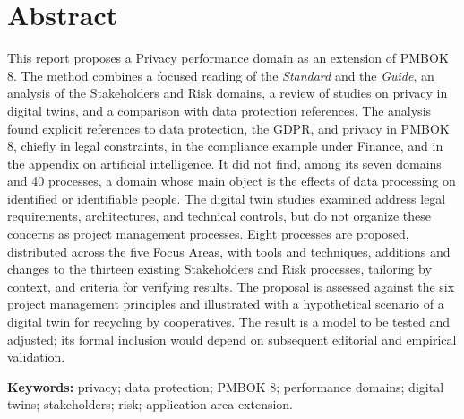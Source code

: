 \documentclass[11pt,a4paper]{article}
\newcommand{\onelineskip}{\baselineskip}
\newenvironment{resumo}[1][Abstract]{\section*{#1}\noindent\ignorespaces}{\bigskip}
\begin{document}
\begin{resumo}[Abstract]
This report proposes a Privacy performance domain as an extension of PMBOK 8. The method combines a focused reading of the \textit{Standard} and the \textit{Guide}, an analysis of the Stakeholders and Risk domains, a review of studies on privacy in digital twins, and a comparison with data protection references. The analysis found explicit references to data protection, the GDPR, and privacy in PMBOK 8, chiefly in legal constraints, in the compliance example under Finance, and in the appendix on artificial intelligence. It did not find, among its seven domains and 40 processes, a domain whose main object is the effects of data processing on identified or identifiable people. The digital twin studies examined address legal requirements, architectures, and technical controls, but do not organize these concerns as project management processes. Eight processes are proposed, distributed across the five Focus Areas, with tools and techniques, additions and changes to the thirteen existing Stakeholders and Risk processes, tailoring by context, and criteria for verifying results. The proposal is assessed against the six project management principles and illustrated with a hypothetical scenario of a digital twin for recycling by cooperatives. The result is a model to be tested and adjusted; its formal inclusion would depend on subsequent editorial and empirical validation.

\vspace{\onelineskip}
\noindent\textbf{Keywords:} privacy; data protection; PMBOK 8; performance domains; digital twins; stakeholders; risk; application area extension.
\end{resumo}
\end{document}
